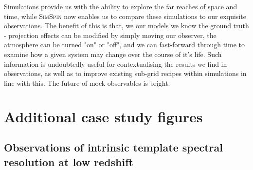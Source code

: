 \documentclass[
  journal=pasa,
  manuscript=research-paper, %
  year=2020,
  volume=37,
]{cup-journal}
\newcommand{\simspin}[1]{\textsc{SimSpin}#1} %
\begin{document}
Simulations provide us with the ability to explore the far reaches of space and time, while \simspin{} now enables us to compare these simulations to our exquisite observations. 
The benefit of this is that, we our models we know the ground truth - projection effects can be modified by simply moving our observer, the atmosphere can be turned "on" or "off", and we can fast-forward through time to examine how a given system may change over the course of it's life. 
Such information is undoubtedly useful for contextualising the results we find in observations, as well as to improve existing sub-grid recipes within simulations in line with this. 
The future of mock observables is bright. 






\appendix






\section{Additional case study figures}
\subsection{Observations of intrinsic template spectral resolution at low redshift}
\label{app:cs1}
\end{document}
